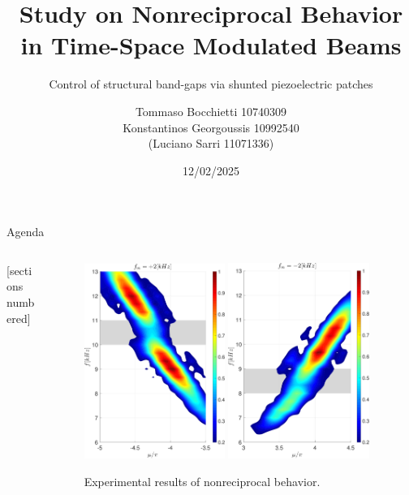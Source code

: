 \documentclass[9pt, draft]{beamer}
\title{Study on Nonreciprocal Behavior in Time-Space Modulated Beams}
\subtitle{Control of structural band-gaps via shunted piezoelectric patches}
\date{12/02/2025}
\author{Tommaso Bocchietti 10740309 \\ Konstantinos Georgoussis 10992540 \\ (Luciano Sarri 11071336)}
\institute{Politecnico di Milano}
\begin{document}
\maketitle

\begin{frame}{Agenda}

    \begin{columns}[c, onlytextwidth]

        \begin{column}{0.4\textwidth}

            [sections numbered]
            \tableofcontents

        \end{column}

        \begin{column}{0.6\textwidth}

            \begin{figure}[H]
                \centering
                \includegraphics[width=0.47\textwidth]{img/MATLAB/EXP_nonreciprocal_@+2kHz.pdf}
                \hspace{1mm}
                \includegraphics[width=0.47\textwidth]{img/MATLAB/EXP_nonreciprocal_@-2kHz.pdf}
                \caption{Experimental results of nonreciprocal behavior.}
            \end{figure}

        \end{column}

    \end{columns}

\end{frame}
\end{document}
